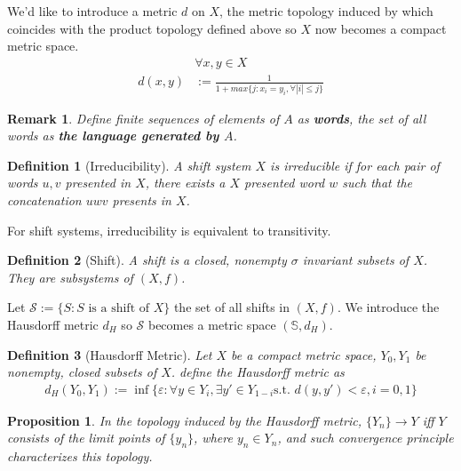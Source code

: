 \documentclass{article}
\newtheorem{definition}{Definition}
\newtheorem{proposition}{Proposition}
\newtheorem{remark}{Remark}
\begin{document}
\begin{CJK}{UTF8}{gbsn}
We'd like to introduce a metric $d$ on $X$, the metric topology induced by which coincides with the product topology defined above so $X$ now becomes a compact metric space.
\begin{align*}
	&\forall x,y\in X \\
	d(x,y)&:=\frac{1}{1+max\{j:x_i=y_i,\forall |i|\leq j\}}
\end{align*}

\begin{remark}
	Define finite sequences of elements of $A$ as \textbf{words}, the set of all words as \textbf{the language generated by $A$}.
\end{remark}


\begin{definition}[Irreducibility]
	A shift system $X$ is irreducible if for each pair of words $u,v$ presented in $X$, there exists a $X$ presented word $w$ such that the concatenation $uwv$ presents in $X$.
\end{definition}

For shift systems, irreducibility is equivalent to transitivity.


\begin{definition}[Shift]
	A shift is a closed, nonempty $\sigma$ invariant subsets of $X$. They are subsystems of $(X,f)$. 
\end{definition}

Let $\mathcal{S}:=\{S:S\mbox{ is a shift of }X\}$ the set of all shifts in $(X,f)$. We introduce the Hausdorff metric $d_H$ so $\mathcal{S}$ becomes a metric space $(\mathbb{S},d_H)$.



\begin{definition}[Hausdorff Metric]
	Let $X$ be a compact metric space, $Y_0,Y_1$ be nonempty, closed subsets of $X$. define the Hausdorff metric as
	\begin{align*}
		d_H(Y_0,Y_1):=\inf\{\varepsilon:\forall y\in Y_i, \exists y'\in Y_{1-i} \mbox{s.t. }d(y,y')<\varepsilon ,i=0,1\}
	\end{align*}
\end{definition}



\begin{proposition}
	In the topology induced by the Hausdorff metric, $\{Y_n\}\rightarrow Y$ iff $Y$ consists of the limit points of $\{y_n\}$, where $y_n\in Y_n$, and such convergence principle characterizes this topology.
\end{proposition}


\end{CJK}
\end{document}
